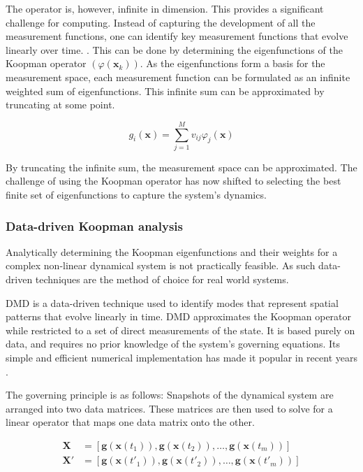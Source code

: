 The operator is, however, infinite in dimension. This provides a significant challenge for computing. Instead of capturing
the development of all the measurement functions, one can identify key measurement functions that evolve linearly over time.
\parencite{bruntonDatadrivenScienceEngineering2019}. This can be done by determining the eigenfunctions of the Koopman
operator \( (\varphi(\mathbf{x}_k)) \). As the eigenfunctions form a basis for the measurement space, each measurement
function can be formulated as an infinite weighted sum of eigenfunctions. This infinite sum can be approximated by
truncating at some point. 

\begin{equation}
    g_i(\mathbf{x}) = \sum_{j = 1}^{M} v_{ij}\varphi_j(\mathbf{x})
    \label{eq:koopman_measurement_spec_decomp}
\end{equation}

By truncating the infinite sum, the measurement space can be approximated. The challenge of
using the Koopman operator has now shifted to selecting the best finite set of eigenfunctions to capture the system's
dynamics.

\subsubsection{Data-driven Koopman analysis}
\label{subsubsec:koopman_data}
Analytically determining the Koopman eigenfunctions and their weights for a complex non-linear dynamical system is not
practically feasible. As such data-driven techniques are the method of choice for real world systems.

DMD is a data-driven technique used to identify modes that represent spatial patterns that evolve linearly in time. DMD
approximates the Koopman operator while restricted to a set of direct measurements of the state. It is based purely on
data, and requires no prior knowledge of the system's governing equations. Its simple and efficient numerical
implementation has made it popular in recent years \parencite{bruntonDataDrivenDynamicalSystems2019}.

The governing principle is as follows: Snapshots of the dynamical system are arranged into two data matrices. These
matrices are then used to solve for a linear operator that maps one data matrix onto the other. 

\begin{equation}
    \label{eq:dmd_X_matrices}
    \begin{split}
    \mathbf{X} &= \left[\mathbf{g}(\mathbf{x}(t_1)), \mathbf{g}(\mathbf{x}(t_2)),\dots,\mathbf{g}(\mathbf{x}(t_m)) \right] \\
    \mathbf{X'} &= \left[\mathbf{g}(\mathbf{x}(t'_1)), \mathbf{g}(\mathbf{x}(t'_2)),\dots,\mathbf{g}(\mathbf{x}(t'_m)) \right]
\end{split}
\end{equation}

